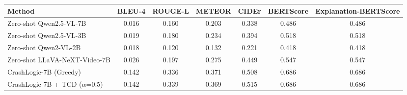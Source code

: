 \begin{tabular}{lcccccc}
\toprule
Method & BLEU-4 & ROUGE-L & METEOR & CIDEr & BERTScore & Explanation-BERTScore \\
\midrule
Zero-shot Qwen2.5-VL-7B & 0.016 & 0.160 & 0.203 & 0.338 & 0.486 & 0.486 \\
Zero-shot Qwen2.5-VL-3B & 0.019 & 0.180 & 0.234 & 0.394 & 0.518 & 0.518 \\
Zero-shot Qwen2-VL-2B & 0.018 & 0.120 & 0.132 & 0.221 & 0.418 & 0.418 \\
Zero-shot LLaVA-NeXT-Video-7B & 0.026 & 0.197 & 0.275 & 0.449 & 0.547 & 0.547 \\
CrashLogic-7B (Greedy) & 0.142 & 0.336 & 0.371 & 0.508 & 0.686 & 0.686 \\
CrashLogic-7B + TCD ($\alpha$=0.5) & 0.142 & 0.339 & 0.369 & 0.515 & 0.686 & 0.686 \\
\bottomrule
\end{tabular}
